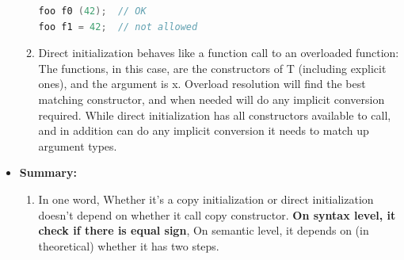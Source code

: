 \documentclass[a4paper,11pt,twoside]{book}
\begin{document}
\begin{itemize}
\begin{enumerate}
\begin{lstlisting}[frame=single, language=c++]
foo f0 (42);  // OK
foo f1 = 42;  // not allowed
\end{lstlisting}

		\item Direct initialization behaves like a function call to an overloaded function: The functions, in this case, are the constructors of T (including explicit ones), and the argument is x. Overload resolution will find the best matching constructor, and when needed will do any implicit conversion required. While direct initialization has all constructors available to call, and in addition can do any implicit conversion it needs to match up argument types.
		
%
% 
%
%
%	
%	
	\end{enumerate}

\item \textbf{Summary:}
\begin{enumerate}
	\item In one word, Whether it's a copy initialization or direct initialization doesn't depend on whether it call copy constructor. \textbf{On syntax level, it check if there is equal sign}, On semantic level,  it depends on (in theoretical) whether it has two steps.
	

\end{enumerate}
\end{itemize}
\end{document}
